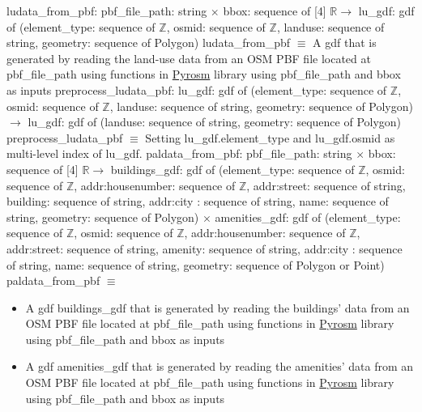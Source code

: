 \documentclass[12pt, titlepage]{article}
\begin{document}
ludata\_from\_pbf: pbf\_file\_path: string $\times$ bbox: sequence of [4] $\mathbb{R} \rightarrow$ lu\_gdf: gdf of (element\_type: sequence of $\mathbb{Z}$, osmid: sequence of $\mathbb{Z}$, landuse: sequence of string, geometry: sequence of Polygon)\newline
ludata\_from\_pbf $\equiv$ A gdf that is generated by reading the land-use data from an OSM PBF file located at pbf\_file\_path using functions in \href{https://pyrosm.readthedocs.io/en/latest/basics.html#read-landuse}{Pyrosm} library using pbf\_file\_path and bbox as inputs\newline\newline
preprocess\_ludata\_pbf: \newline
lu\_gdf: gdf of (element\_type: sequence of $\mathbb{Z}$, osmid: sequence of $\mathbb{Z}$, landuse: sequence of string, geometry: sequence of Polygon) \newline $\rightarrow$ \newline lu\_gdf: gdf of (landuse: sequence of string, geometry: sequence of Polygon) \newline
preprocess\_ludata\_pbf $\equiv$ Setting lu\_gdf.element\_type and lu\_gdf.osmid as multi-level index of lu\_gdf.\newline\newline
paldata\_from\_pbf: pbf\_file\_path: string $\times$ bbox: sequence of [4] $\mathbb{R} \rightarrow$ \newline
buildings\_gdf: gdf of (element\_type: sequence of $\mathbb{Z}$, osmid: sequence of $\mathbb{Z}$, addr:housenumber: sequence of $\mathbb{Z}$, addr:street: sequence of string, building: sequence of string, addr:city : sequence of string, name: sequence of string, geometry: sequence of Polygon) $\times$ \newline
amenities\_gdf: gdf of (element\_type: sequence of $\mathbb{Z}$, osmid: sequence of $\mathbb{Z}$, addr:housenumber: sequence of $\mathbb{Z}$, addr:street: sequence of string, amenity: sequence of string, addr:city : sequence of string, name: sequence of string, geometry: sequence of Polygon or Point)\newline
paldata\_from\_pbf $\equiv$
\begin{itemize}
    \item A gdf buildings\_gdf that is generated by reading the buildings' data from an OSM PBF file located at pbf\_file\_path using functions in \href{https://pyrosm.readthedocs.io/en/latest/basics.html#read-buildings}{Pyrosm} library using pbf\_file\_path and bbox as inputs
    \item A gdf amenities\_gdf that is generated by reading the amenities' data from an OSM PBF file located at pbf\_file\_path using functions in \href{https://pyrosm.readthedocs.io/en/latest/basics.html#read-points-of-interest}{Pyrosm} library using pbf\_file\_path and bbox as inputs
\end{itemize}
\end{document}
